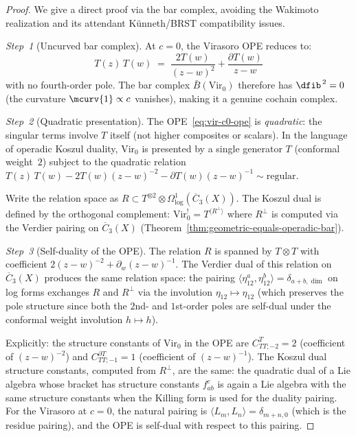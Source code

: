 \begin{proof}
We give a direct proof via the bar complex, avoiding the Wakimoto
realization and its attendant K\"unneth/BRST compatibility issues.

\emph{Step~1} (Uncurved bar complex).
At $c = 0$, the Virasoro OPE reduces to:
\begin{equation}\label{eq:vir-c0-ope}
T(z)\,T(w) \;=\; \frac{2T(w)}{(z-w)^2} + \frac{\partial T(w)}{z-w}
\end{equation}
with no fourth-order pole.  The bar complex
$\bar{B}(\mathrm{Vir}_0)$ therefore has $\dfib^{\,2} = 0$ (the curvature
$\mcurv{1} \propto c$ vanishes), making it a genuine cochain complex.

\emph{Step~2} (Quadratic presentation).
The OPE~\eqref{eq:vir-c0-ope} is \emph{quadratic}: the singular terms
involve $T$ itself (not higher composites or scalars).
In the language of operadic Koszul duality, $\mathrm{Vir}_0$ is presented
by a single generator $T$ (conformal weight~$2$) subject to the quadratic
relation $T(z)\,T(w) - 2T(w)(z-w)^{-2} - \partial T(w)(z-w)^{-1}
\sim \text{regular}$.

Write the relation space as $R \subset T^{\otimes 2} \otimes
\Omega^1_{\log}(\overline{C}_3(X))$.  The Koszul dual is defined by the
orthogonal complement:
$\mathrm{Vir}_0^! = T^{\langle R^\perp \rangle}$
where $R^\perp$ is computed via the Verdier pairing on
$\overline{C}_3(X)$ (Theorem~\ref{thm:geometric-equals-operadic-bar}).

\emph{Step~3} (Self-duality of the OPE).
The relation $R$ is spanned by $T \otimes T$ with coefficient
$2(z-w)^{-2} + \partial_w(z-w)^{-1}$.  The Verdier dual of this relation
on $\overline{C}_3(X)$ produces the same relation space:
the pairing $\langle \eta_{12}^a, \eta_{12}^b \rangle =
\delta_{a+b, \dim}$ on log forms exchanges $R$ and $R^\perp$ via the
involution $\eta_{12} \mapsto \eta_{12}$ (which preserves the pole
structure since both the $2$nd- and $1$st-order poles are self-dual under
the conformal weight involution $h \mapsto h$).

Explicitly: the structure constants of $\mathrm{Vir}_0$ in the OPE
are $C^T_{TT;-2} = 2$ (coefficient of $(z-w)^{-2}$) and
$C^{\partial T}_{TT;-1} = 1$ (coefficient of $(z-w)^{-1}$).
The Koszul dual structure constants, computed from
$R^\perp$, are the same: the quadratic dual of a Lie algebra
whose bracket has structure constants $f^c_{ab}$ is again a Lie algebra
with the same structure constants when the Killing form is used for
the duality pairing.  For the Virasoro at $c = 0$, the natural pairing
is $\langle L_m, L_n \rangle = \delta_{m+n,0}$ (which is the residue
pairing), and the OPE is self-dual with respect to this pairing.


\end{proof}
